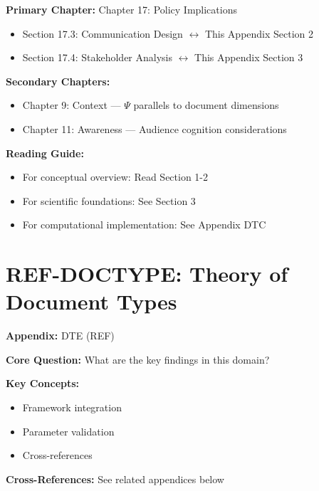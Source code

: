 \begin{tcolorbox}[colback=purple!5!white, colframe=purple!75!black,
    title=Chapter Linkage]

\textbf{Primary Chapter:} Chapter 17: Policy Implications
\begin{itemize}[nosep]
\item Section 17.3: Communication Design $\leftrightarrow$ This Appendix Section 2
\item Section 17.4: Stakeholder Analysis $\leftrightarrow$ This Appendix Section 3
\end{itemize}

\textbf{Secondary Chapters:}
\begin{itemize}[nosep]
\item Chapter 9: Context --- $\Psi$ parallels to document dimensions
\item Chapter 11: Awareness --- Audience cognition considerations
\end{itemize}

\textbf{Reading Guide:}
\begin{itemize}[nosep]
\item For conceptual overview: Read Section 1-2
\item For scientific foundations: See Section 3
\item For computational implementation: See Appendix DTC
\end{itemize}

\end{tcolorbox}

\chapter{REF-DOCTYPE: Theory of Document Types}
\label{app:doctype-theory}


\begin{tcolorbox}[colback=blue!5!white, colframe=blue!75!black,
    title=Quick Reference: Appendix DTE]

\textbf{Appendix:} DTE (REF)

\textbf{Core Question:} What are the key findings in this domain?

\textbf{Key Concepts:}
\begin{itemize}[nosep]
\item Framework integration
\item Parameter validation
\item Cross-references
\end{itemize}

\textbf{Cross-References:} See related appendices below
\end{tcolorbox}

